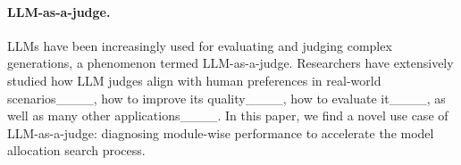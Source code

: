 \paragraph{LLM-as-a-judge.} LLMs have been increasingly used for evaluating and judging complex generations, a phenomenon termed LLM-as-a-judge. Researchers have extensively studied how LLM judges align with human preferences in real-world scenarios____, how to improve its quality____, how to evaluate it____, as well as many other applications____. In this paper, we find a novel use case of LLM-as-a-judge: diagnosing module-wise performance to accelerate the model allocation search process.